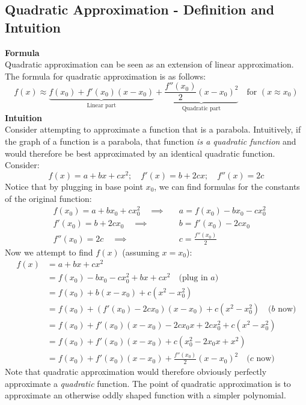 \documentclass{report}
\begin{document}
\subsection{Quadratic Approximation - Definition and Intuition} %
\textbf{Formula}\\
Quadratic approximation can be seen as an extension of linear approximation.
The formula for quadratic approximation is as follows:
\begin{equation*}
f(x)\approx \underbrace{f(x_0)+f'(x_0)(x-x_0)}_{\text{Linear part}}
+\underbrace{\frac{f''(x_0)}{2}(x-x_0)^2}_{\text{Quadratic part}}
\quad\text{for $(x\approx x_0)$}
\end{equation*}
\textbf{Intuition}\\
Consider attempting to approximate a function that is a parabola. Intuitively, 
if the graph of a function is a parabola, that function \textit{is a quadratic function} 
and would therefore be best approximated by an identical quadratic function. Consider:
\begin{equation*}
f(x)=a+bx+cx^2;\quad f'(x)=b+2cx;\quad f''(x)=2c
\end{equation*}
Notice that by plugging in base point $x_0$, we can find formulas for the constants of the original function:
\begin{align*}
&f(x_0)=a+bx_0+cx_0^2\quad\implies&&a=f(x_0)-bx_0-cx_0^2\\
&f'(x_0)=b+2cx_0\quad\implies&&b=f'(x_0)-2cx_0\\
&f''(x_0)=2c\quad\implies&&c=\frac{f''(x_0)}{2}
\end{align*}
Now we attempt to find $f(x)$ (assuming $x=x_0$):
\begin{align*}
f(x)&=a+bx+cx^2\\
&=f(x_0)-bx_0-cx_0^2+bx+cx^2\quad\text{(plug in $a$)}\\
&=f(x_0)+b(x-x_0)+c(x^2-x_0^2)\\
&=f(x_0)+(f'(x_0)-2cx_0)(x-x_0)+c(x^2-x_0^2)\quad\text{($b$ now)}\\
&=f(x_0)+f'(x_0)(x-x_0)-2cx_0x+2cx_0^2+c(x^2-x_0^2)\\
&=f(x_0)+f'(x_0)(x-x_0)+c(x_0^2-2x_0x+x^2)\\
&=f(x_0)+f'(x_0)(x-x_0)+\frac{f''(x_0)}{2}(x-x_0)^2\quad\text{($c$ now)}
\end{align*}
Note that quadratic approximation would therefore obviously perfectly approximate
a \textit{quadratic} function. The point of quadratic approximation is to approximate
an otherwise oddly shaped function with a simpler polynomial.\\
\end{document}
